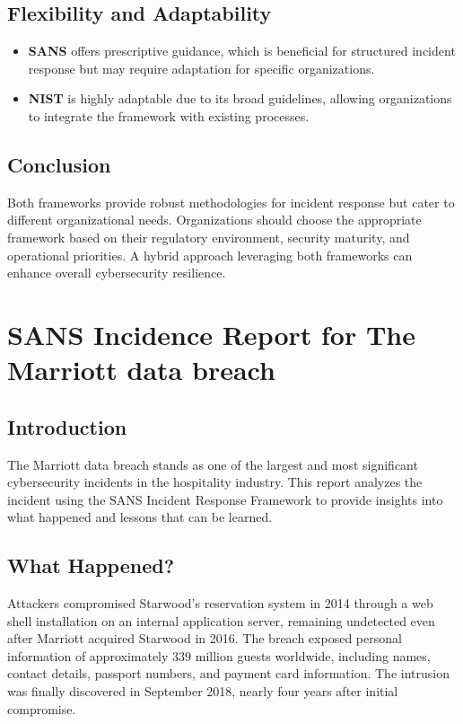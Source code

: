 \documentclass[11pt]{book}
\begin{document}
\section{Flexibility and Adaptability}
\begin{itemize}
    \item \textbf{SANS} offers prescriptive guidance, which is beneficial for structured incident response but may require adaptation for specific organizations.
    \item \textbf{NIST} is highly adaptable due to its broad guidelines, allowing organizations to integrate the framework with existing processes.
\end{itemize}

\section{Conclusion}
Both frameworks provide robust methodologies for incident response but cater to different organizational needs. Organizations should choose the appropriate framework based on their regulatory environment, security maturity, and operational priorities. A hybrid approach leveraging both frameworks can enhance overall cybersecurity resilience.


\chapter{SANS Incidence Report for The Marriott data breach}

\section{Introduction}
The Marriott data breach stands as one of the largest and most significant cybersecurity incidents in the hospitality industry. This report analyzes the incident using the SANS Incident Response Framework to provide insights into what happened and lessons that can be learned.

\section{What Happened?}
Attackers compromised Starwood's reservation system in 2014 through a web shell installation on an internal application server, remaining undetected even after Marriott acquired Starwood in 2016. The breach exposed personal information of approximately 339 million guests worldwide, including names, contact details, passport numbers, and payment card information. The intrusion was finally discovered in September 2018, nearly four years after initial compromise.
\end{document}
